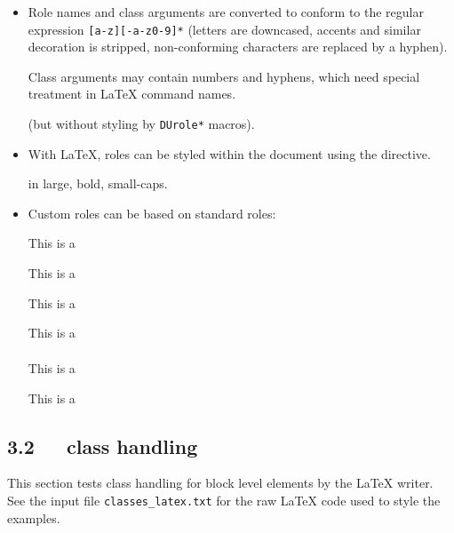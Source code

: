 \documentclass[a4paper]{article}
\begin{document}
\begin{itemize}
\item Role names and class arguments are converted to conform to the
regular expression \texttt{{[}a-z{]}{[}-a-z0-9{]}*} (letters are downcased,
accents and similar decoration is stripped, non-conforming
characters are replaced by a hyphen).

Class arguments may contain numbers and hyphens, which need special
treatment in LaTeX command names.

 (but without styling by \texttt{DUrole*}
macros).

\item With LaTeX, roles can be styled within the document using the 
directive.

\newcommand{\DUrolelarge}[1]{{\large #1}}
\makeatletter
{}
\makeatother

 in large, bold, small-caps.

\item Custom roles can be based on standard roles:

This is a \emph{}

This is a \texttt{}

This is a \textbf{}

This is a \textsubscript{}

This is a \textsuperscript{}

This is a 
\end{itemize}


\subsection{3.2   class handling%
  \label{class-handling}%
}

This section tests class handling for block level elements by the LaTeX
writer. See the input file \texttt{classes\_latex.txt} for the raw LaTeX code used
to style the examples.
\end{document}
